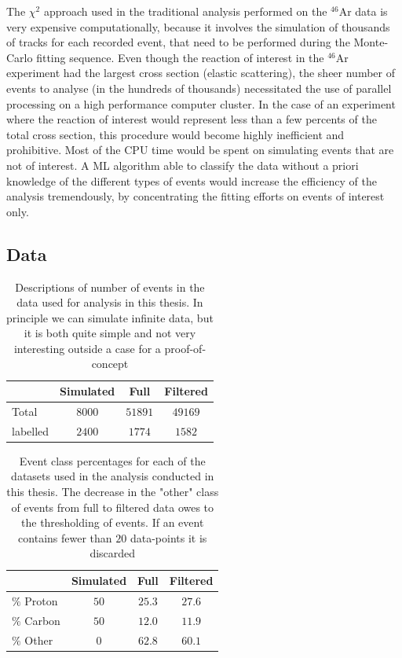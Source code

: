 \documentclass[preprint,12pt]{elsarticle}
\begin{document}
The $\chi^2$ approach used in the traditional analysis performed on the $^{46}$Ar data is very expensive computationally, because it involves the simulation of thousands of tracks for each recorded event, that need to be performed during the Monte-Carlo fitting sequence. Even though the reaction of interest in the $^{46}$Ar experiment had the largest cross section (elastic scattering), the sheer number of events to analyse (in the hundreds of thousands) necessitated the use of parallel processing on a high performance computer cluster. In the case of an experiment where the reaction of interest would represent less than a few percents of the total cross section, this procedure would become highly inefficient and prohibitive. Most of the CPU time would be spent on simulating events that are not of interest. A ML algorithm able to classify the data without a priori knowledge of the different types of events would increase the efficiency of the analysis tremendously, by concentrating the fitting efforts on events of interest only.

\subsection{Data}

\begin{table}
\centering
\caption{Descriptions of number of events in the data used for analysis in this thesis. In principle we can simulate infinite data, but it is both quite simple and not very interesting outside a case for a proof-of-concept}\label{tab:datasets}
\begin{tabular}{lccc}
\toprule
{} & Simulated & Full & Filtered \\
\midrule
Total &  $8000$ & $51891$ & $49169$ \\
labelled & $2400$ & $1774$ &  $1582$ \\ 
\bottomrule
\end{tabular}
\end{table}

\begin{table}
\centering
\caption{Event class percentages for each of the datasets used in the analysis conducted in this thesis. The decrease in the "other" class of events from full to filtered data owes to the thresholding of events. If an event contains fewer than $20$ data-points it is discarded}\label{tab:class_distr}
\begin{tabular}{lccc}
\toprule
{} & Simulated & Full & Filtered \\
\midrule
$\%$ Proton & $50$ & $25.3$ & $27.6$ \\ 
$\%$ Carbon & $50$ & $12.0$ & $11.9$ \\
$\%$ Other & $0$ & $62.8$ & $60.1$ \\
\end{tabular}
\end{table}
\end{document}

